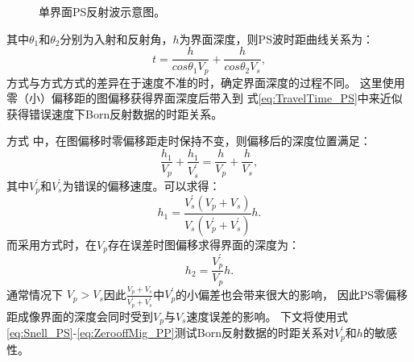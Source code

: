 \begin{figure}
   \centering
   \caption{单界面PS反射波示意图。}
   \label{fig:PS_refl}
\end{figure}
其中$\theta_1$和$\theta_2$分别为入射和反射角，$h$为界面深度，则PS波时距曲线关系为：
\begin{equation}
	t=\frac{h}{cos\theta_1V_p}+\frac{h}{cos\theta_2V_s},
    \label{eq:TravelTime_PS} 
\end{equation}
方式\uppercase\expandafter{}与方式方式\uppercase\expandafter{}的差异在于速度不准的时，确定界面深度的过程不同。
这里使用零（小）偏移距的图偏移获得界面深度后带入到
式\eqref{eq:TravelTime_PS}中来近似获得错误速度下Born反射数据的时距关系。

方式\uppercase\expandafter{}
中，在图偏移时零偏移距走时保持不变，则偏移后的深度位置满足：
\begin{equation}
	\frac{h_{1}}{V_p}+\frac{h_{1}}{V^{'}_s}=\frac{h}{V_p}+\frac{h}{V_s},
    \label{eq:Mapmigration_PS} 
\end{equation}
其中$V^{'}_p$和$V^{'}_s$为错误的偏移速度。可以求得：
\begin{equation}
	{h_{1}}=\frac{V^{'}_s(V_p+V_s)}{V_s(V^{'}_p+V^{'}_s)}h.
    \label{eq:ZerooffMig_PS} 
\end{equation}
而采用方式\uppercase\expandafter{}时，在$V_p$存在误差时图偏移求得界面的深度为：
\begin{equation}
	{h_{2}}=\frac{V^{'}_p}{V_p}h.
    \label{eq:ZerooffMig_PP} 
\end{equation}
通常情况下
$V_p>V_s$因此$\frac{V_p+V_s}{V^{'}_p+V^{'}_s}$中$V^{'}_p$的小偏差也会带来很大的影响，
因此PS零偏移距成像界面的深度会同时受到$V_p$与$V_s$速度误差的影响。
下文将使用式\eqref{eq:Snell_PS}-\eqref{eq:ZerooffMig_PP}测试Born反射数据的时距关系对$V^{'}_p$和$h$的敏感性。

